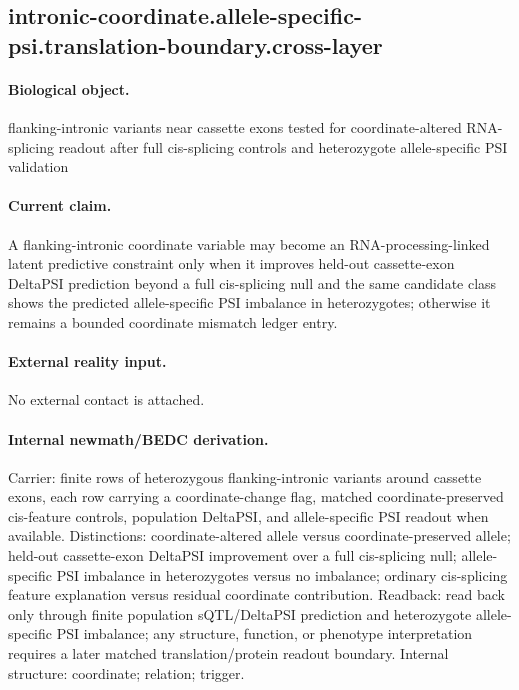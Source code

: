 \subsection{intronic-coordinate.allele-specific-psi.translation-boundary.cross-layer}

\paragraph{Biological object.} flanking-intronic variants near cassette exons tested for coordinate-altered RNA-splicing readout after full cis-splicing controls and heterozygote allele-specific PSI validation

\paragraph{Current claim.} A flanking-intronic coordinate variable may become an RNA-processing-linked latent predictive constraint only when it improves held-out cassette-exon DeltaPSI prediction beyond a full cis-splicing null and the same candidate class shows the predicted allele-specific PSI imbalance in heterozygotes; otherwise it remains a bounded coordinate mismatch ledger entry.

\paragraph{External reality input.}
No external contact is attached.

\paragraph{Internal newmath/BEDC derivation.} Carrier: finite rows of heterozygous flanking-intronic variants around cassette exons, each row carrying a coordinate-change flag, matched coordinate-preserved cis-feature controls, population DeltaPSI, and allele-specific PSI readout when available. Distinctions: coordinate-altered allele versus coordinate-preserved allele; held-out cassette-exon DeltaPSI improvement over a full cis-splicing null; allele-specific PSI imbalance in heterozygotes versus no imbalance; ordinary cis-splicing feature explanation versus residual coordinate contribution. Readback: read back only through finite population sQTL/DeltaPSI prediction and heterozygote allele-specific PSI imbalance; any structure, function, or phenotype interpretation requires a later matched translation/protein readout boundary. Internal structure: coordinate; relation; trigger.

